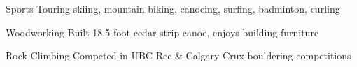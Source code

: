 

\begin{cvskills}

  \cvskill
    {Sports} %
    {Touring skiing, mountain biking, canoeing, surfing, badminton, curling} %

  \cvskill
    {Woodworking} %
    {Built 18.5 foot cedar strip canoe, enjoys building furniture} %

  \cvskill
    {Rock Climbing} %
    {Competed in UBC Rec \& Calgary Crux bouldering competitions} %

\end{cvskills}
